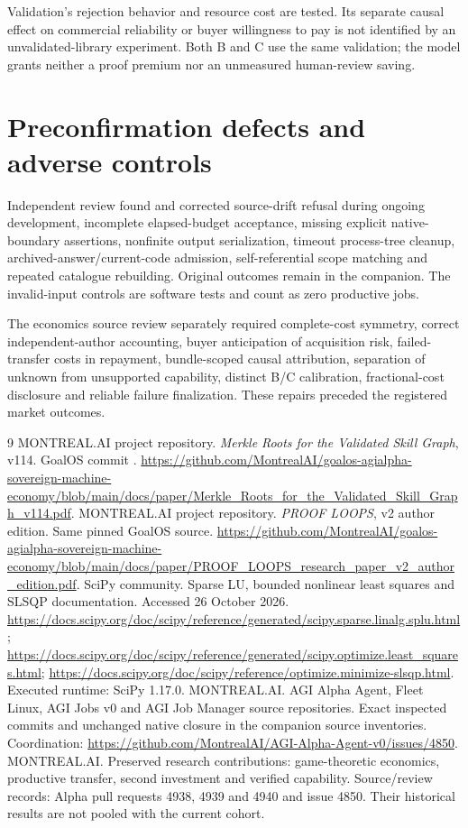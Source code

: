 \documentclass[11pt,letterpaper]{article}
\newcommand{\code}[1]{\texttt{\detokenize{#1}}}
\begin{document}
Validation's rejection behavior and resource cost are tested. Its separate causal effect on commercial reliability or buyer willingness to pay is not identified by an unvalidated-library experiment. Both B and C use the same validation; the model grants neither a proof premium nor an unmeasured human-review saving.

\section{Preconfirmation defects and adverse controls}

Independent review found and corrected source-drift refusal during ongoing development, incomplete elapsed-budget acceptance, missing explicit native-boundary assertions, nonfinite output serialization, timeout process-tree cleanup, archived-answer/current-code admission, self-referential scope matching and repeated catalogue rebuilding. Original outcomes remain in the companion. The invalid-input controls are software tests and count as zero productive jobs.

The economics source review separately required complete-cost symmetry, correct independent-author accounting, buyer anticipation of acquisition risk, failed-transfer costs in repayment, bundle-scoped causal attribution, separation of unknown from unsupported capability, distinct B/C calibration, fractional-cost disclosure and reliable failure finalization. These repairs preceded the registered market outcomes.

\begin{thebibliography}{9}
 MONTREAL.AI project repository. \emph{Merkle Roots for the Validated Skill Graph}, v114. GoalOS commit \code{1e9a5675b1662e98074fb1c71cf2c5b94c7d259f}. \url{https://github.com/MontrealAI/goalos-agialpha-sovereign-machine-economy/blob/main/docs/paper/Merkle_Roots_for_the_Validated_Skill_Graph_v114.pdf}.
 MONTREAL.AI project repository. \emph{PROOF LOOPS}, v2 author edition. Same pinned GoalOS source. \url{https://github.com/MontrealAI/goalos-agialpha-sovereign-machine-economy/blob/main/docs/paper/PROOF_LOOPS_research_paper_v2_author_edition.pdf}.
 SciPy community. Sparse LU, bounded nonlinear least squares and SLSQP documentation. Accessed 26 October 2026. \url{https://docs.scipy.org/doc/scipy/reference/generated/scipy.sparse.linalg.splu.html}; \url{https://docs.scipy.org/doc/scipy/reference/generated/scipy.optimize.least_squares.html}; \url{https://docs.scipy.org/doc/scipy/reference/optimize.minimize-slsqp.html}. Executed runtime: SciPy 1.17.0.
 MONTREAL.AI. AGI Alpha Agent, Fleet Linux, AGI Jobs v0 and AGI Job Manager source repositories. Exact inspected commits and unchanged native closure in the companion source inventories. Coordination: \url{https://github.com/MontrealAI/AGI-Alpha-Agent-v0/issues/4850}.
 MONTREAL.AI. Preserved research contributions: game-theoretic economics, productive transfer, second investment and verified capability. Source/review records: Alpha pull requests 4938, 4939 and 4940 and issue 4850. Their historical results are not pooled with the current cohort.
\end{thebibliography}
\end{document}
